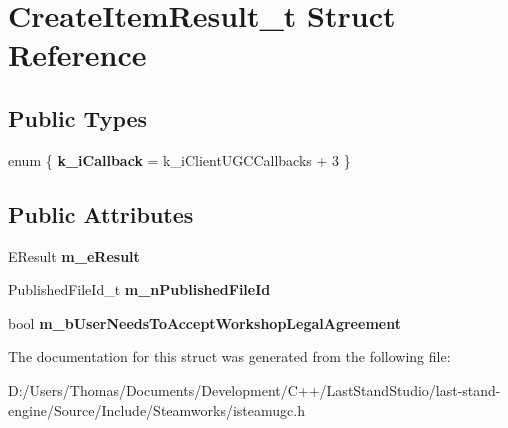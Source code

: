 \hypertarget{structCreateItemResult__t}{}\section{Create\+Item\+Result\+\_\+t Struct Reference}
\label{structCreateItemResult__t}
\subsection*{Public Types}
\begin{DoxyCompactItemize}
\item 
\hypertarget{structCreateItemResult__t_a834d0eec26f02411b1c75570d8bfea2e}{}enum \{ {\bfseries k\+\_\+i\+Callback} = k\+\_\+i\+Client\+U\+G\+C\+Callbacks + 3
 \}\label{structCreateItemResult__t_a834d0eec26f02411b1c75570d8bfea2e}

\end{DoxyCompactItemize}
\subsection*{Public Attributes}
\begin{DoxyCompactItemize}
\item 
\hypertarget{structCreateItemResult__t_aac8b851d7881c0df30b2b7dedf80ed6b}{}E\+Result {\bfseries m\+\_\+e\+Result}\label{structCreateItemResult__t_aac8b851d7881c0df30b2b7dedf80ed6b}

\item 
\hypertarget{structCreateItemResult__t_adfb9da81546dd258d63243a61f11e62e}{}Published\+File\+Id\+\_\+t {\bfseries m\+\_\+n\+Published\+File\+Id}\label{structCreateItemResult__t_adfb9da81546dd258d63243a61f11e62e}

\item 
\hypertarget{structCreateItemResult__t_a200b936a3a485cc3aee43218496d8115}{}bool {\bfseries m\+\_\+b\+User\+Needs\+To\+Accept\+Workshop\+Legal\+Agreement}\label{structCreateItemResult__t_a200b936a3a485cc3aee43218496d8115}

\end{DoxyCompactItemize}


The documentation for this struct was generated from the following file\+:\begin{DoxyCompactItemize}
\item 
D\+:/\+Users/\+Thomas/\+Documents/\+Development/\+C++/\+Last\+Stand\+Studio/last-\/stand-\/engine/\+Source/\+Include/\+Steamworks/isteamugc.\+h\end{DoxyCompactItemize}
